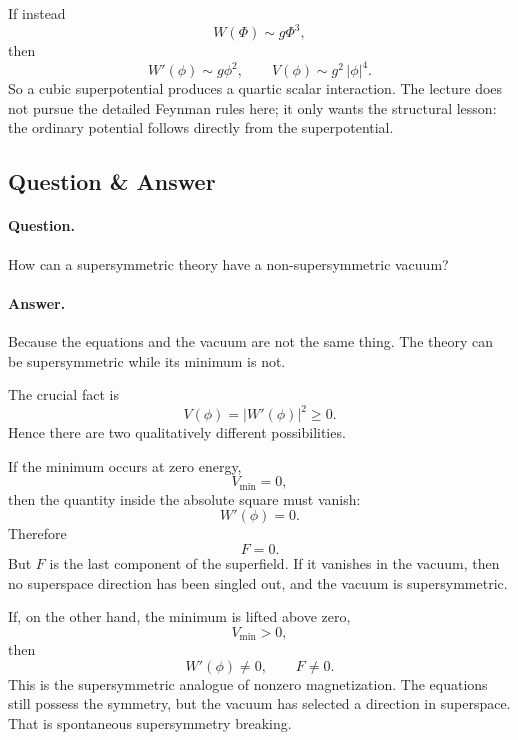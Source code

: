 If instead
\begin{equation}
W(\Phi)\sim g\Phi^3,
\end{equation}
then
\begin{equation}
W'(\phi)\sim g\phi^2,
\qquad
V(\phi)\sim g^2\,|\phi|^4.
\end{equation}
So a cubic superpotential produces a quartic scalar interaction. The lecture does not pursue the detailed Feynman rules here; it only wants the structural lesson: the ordinary potential follows directly from the superpotential.

\subsection{Question \& Answer}

\paragraph{Question.} How can a supersymmetric theory have a non-supersymmetric vacuum?

\paragraph{Answer.} Because the equations and the vacuum are not the same thing. The theory can be supersymmetric while its minimum is not.

The crucial fact is
\begin{equation}
V(\phi)=|W'(\phi)|^2\ge 0.
\end{equation}
Hence there are two qualitatively different possibilities.

If the minimum occurs at zero energy,
\begin{equation}
V_{\min}=0,
\end{equation}
then the quantity inside the absolute square must vanish:
\begin{equation}
W'(\phi)=0.
\end{equation}
Therefore
\begin{equation}
F=0.
\end{equation}
But \(F\) is the last component of the superfield. If it vanishes in the vacuum, then no superspace direction has been singled out, and the vacuum is supersymmetric.

If, on the other hand, the minimum is lifted above zero,
\begin{equation}
V_{\min}>0,
\end{equation}
then
\begin{equation}
W'(\phi)\neq 0,
\qquad
F\neq 0.
\end{equation}
This is the supersymmetric analogue of nonzero magnetization. The equations still possess the symmetry, but the vacuum has selected a direction in superspace. That is spontaneous supersymmetry breaking.

